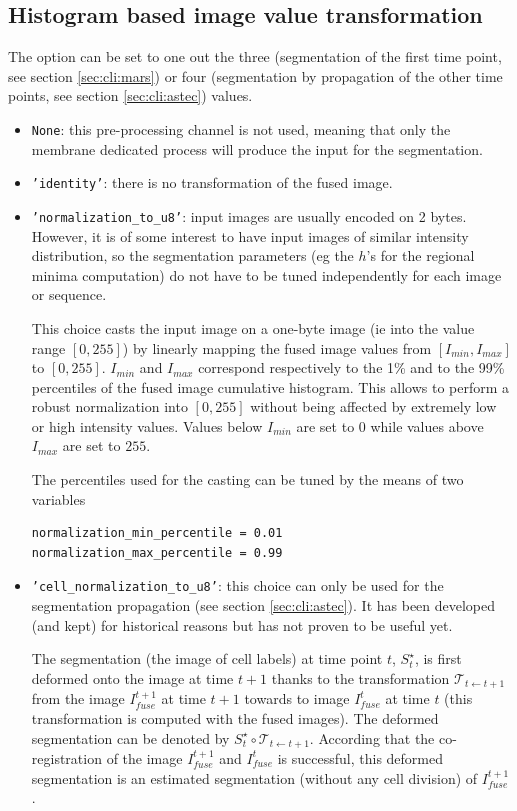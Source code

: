 \subsection{Histogram based image value transformation}
\label{sec:cli:input:image:preprocessing:histogram}

The option  can be set to one out the three (segmentation of the first time point, see section \ref{sec:cli:mars}) or four (segmentation by propagation of the other time points, see section \ref{sec:cli:astec}) values.
\begin{itemize}
\itemsep -0.5ex
\item \texttt{None}: this pre-processing channel is not used, meaning that only the membrane dedicated process will produce the input for the segmentation.
\item \texttt{'identity'}: there is no transformation of the fused image.
\item \texttt{'normalization\_to\_u8'}: input images are usually encoded on 2 bytes. However, it is of some interest to have input images of similar intensity distribution, so the segmentation parameters (eg the $h$'s for the regional minima computation) do not have to be tuned independently for each image or sequence.

This choice casts the input image on a one-byte image (ie into the value range $[0, 255]$) 
by linearly mapping the fused image values from $[I_{min}, I_{max}]$ to $[0, 255]$. $I_{min}$ and $I_{max}$ correspond respectively to the 1\% and to the 99\% percentiles of the fused image cumulative histogram. This allows to perform a robust normalization into $[0, 255]$ without being affected by extremely low or high intensity values.
Values below $I_{min}$ are set to $0$ while values above $I_{max}$ are set to $255$.

The percentiles used for the casting can be tuned by the means of two variables
\begin{verbatim}
normalization_min_percentile = 0.01
normalization_max_percentile = 0.99
\end{verbatim}

\item \texttt{'cell\_normalization\_to\_u8'}: this choice can only be used for the segmentation propagation (see section \ref{sec:cli:astec}). It has been developed (and kept) for historical reasons but has not proven to be useful yet. 
 
The segmentation (the image of cell labels) at time point $t$, $S^{\star}_t$, is first deformed onto the image at time $t+1$ thanks to the transformation $\mathcal{T}_{t \leftarrow t+1}$ from the image $I^{t+1}_{fuse}$ at time $t+1$ towards to image $I^{t}_{fuse}$ at time $t$ (this transformation is computed with the fused images). The deformed segmentation can be denoted by $S^{\star}_t \circ \mathcal{T}_{t \leftarrow t+1}$. 
According that the co-registration of the image $I^{t+1}_{fuse}$ and $I^{t}_{fuse}$ is successful, this deformed segmentation is an estimated segmentation (without any cell division) of $I^{t+1}_{fuse}$. 


\end{itemize}

